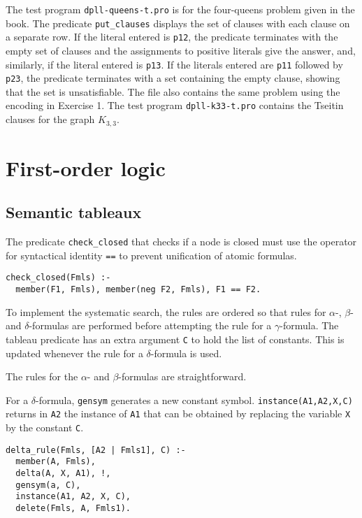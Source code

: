 \documentclass[11pt]{article}
\newcommand*{\p}[1]{\textup{\texttt{#1}}}
\begin{document}
The test program \p{dpll-queens-t.pro} is for the four-queens problem
given in the book. The predicate \p{put\_clauses} displays the set of
clauses with each clause on a separate row. If the literal entered is
\p{p12}, the predicate terminates with the empty set of clauses and the
assignments to positive literals give the answer, and, similarly, if the
literal entered is \p{p13}. If the literals entered are \p{p11} followed
by \p{p23}, the predicate terminates with a set containing the empty
clause, showing that the set is unsatisfiable. The file also contains
the same problem using the encoding in Exercise 1. The test program
\p{dpll-k33-t.pro} contains the Tseitin clauses for the graph $K_{3,3}$.

\section{First-order logic}

\subsection{Semantic tableaux}\label{s.tabfol}

The predicate \p{check\_closed} that checks if a node is closed must use
the operator for syntactical identity \p{==} to prevent unification of
atomic formulas.

\begin{verbatim}
check_closed(Fmls) :-
  member(F1, Fmls), member(neg F2, Fmls), F1 == F2.
\end{verbatim}

To implement the systematic search, the rules are ordered so that rules
for $\alpha$-, $\beta$- and $\delta$-formulas are performed before
attempting the rule for a $\gamma$-formula. The tableau predicate has an
extra argument \p{C} to hold the list of constants. This is updated
whenever the rule for a $\delta$-formula is used.

The rules for the $\alpha$- and $\beta$-formulas are straightforward.

For a $\delta$-formula, \p{gensym} generates a new constant symbol.
\p{instance(A1,A2,X,C)} returns in \p{A2} the instance of \p{A1} that
can be obtained by replacing the variable \p{X} by the constant \p{C}.

\begin{verbatim}
delta_rule(Fmls, [A2 | Fmls1], C) :-
  member(A, Fmls),
  delta(A, X, A1), !,
  gensym(a, C),
  instance(A1, A2, X, C),
  delete(Fmls, A, Fmls1).
\end{verbatim}
\end{document}
